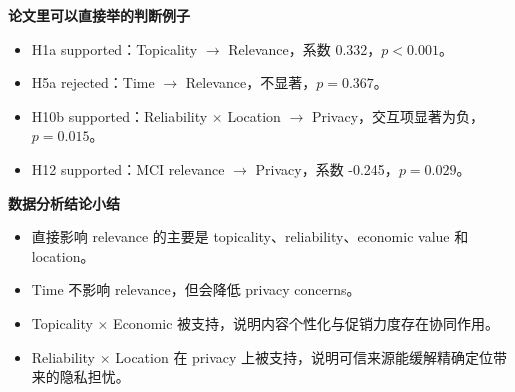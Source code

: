 \documentclass[aspectratio=169,UTF8,zihao=-4]{ctexbeamer}
\newcommand{\bigidea}[1]{
  \begin{center}
    \vspace{0.8em}
    {\LARGE \bfseries #1}
    \vspace{0.6em}
  \end{center}
}
\begin{document}
\begin{frame}
  \bigidea{论文里可以直接举的判断例子}
  \begin{itemize}
    \item \Large H1a supported：Topicality $\rightarrow$ Relevance，系数 0.332，$p<0.001$。
    \item \Large H5a rejected：Time $\rightarrow$ Relevance，不显著，$p=0.367$。
    \item \Large H10b supported：Reliability $\times$ Location $\rightarrow$ Privacy，交互项显著为负，$p=0.015$。
    \item \Large H12 supported：MCI relevance $\rightarrow$ Privacy，系数 -0.245，$p=0.029$。
  \end{itemize}
\end{frame}

\begin{frame}
  \bigidea{数据分析结论小结}
  \begin{itemize}
    \item \Large 直接影响 relevance 的主要是 topicality、reliability、economic value 和 location。
    \item \Large Time 不影响 relevance，但会降低 privacy concerns。
    \item \Large Topicality $\times$ Economic 被支持，说明内容个性化与促销力度存在协同作用。
    \item \Large Reliability $\times$ Location 在 privacy 上被支持，说明可信来源能缓解精确定位带来的隐私担忧。
  \end{itemize}
\end{frame}
\end{document}
